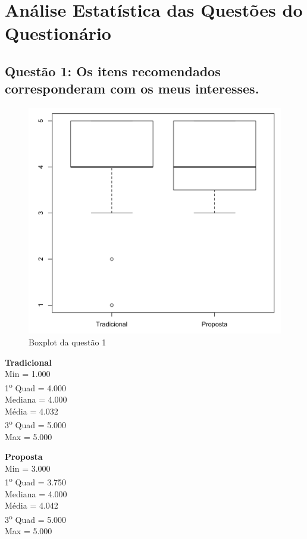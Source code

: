 \chapter{Análise Estatística das Questões do Questionário}\label{ape:analise-estatistica-questionario}

\section{Questão 1: Os itens recomendados corresponderam com os meus interesses.}

\begin{figure}[htb]
  \caption{\label{fig:questao1-boxplot}Boxplot da questão 1}
  \begin{center}
      \includegraphics[scale=0.4]{./Figuras/questao1-boxplot.png}
  \end{center}
\end{figure}

\begin{multicols}{2}

\noindent\textbf{Tradicional}\\
Min = 1.000\\
1\textsuperscript{o} Quad = 4.000\\
Mediana = 4.000\\
Média = 4.032\\
3\textsuperscript{o} Quad = 5.000\\
Max = 5.000\\
\columnbreak

\noindent\textbf{Proposta}\\
Min = 3.000\\
1\textsuperscript{o} Quad = 3.750\\
Mediana = 4.000\\
Média = 4.042\\
3\textsuperscript{o} Quad = 5.000\\
Max = 5.000
\end{multicols}

